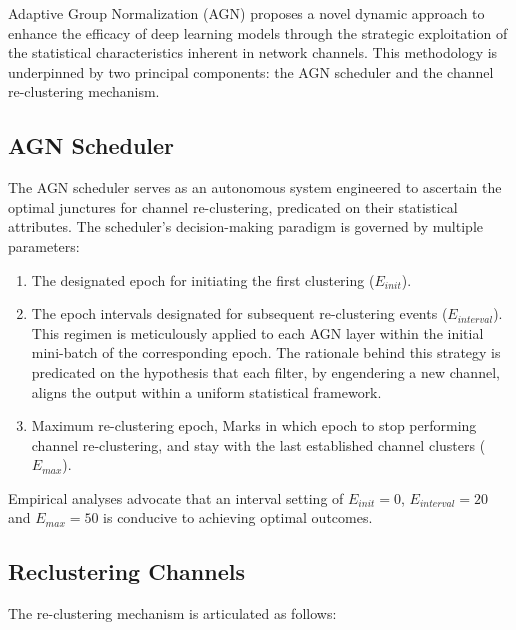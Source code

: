 Adaptive Group Normalization (AGN) proposes a novel dynamic approach to enhance the efficacy of deep learning models through the strategic exploitation of the statistical characteristics inherent in network channels. This methodology is underpinned by two principal components: the AGN scheduler and the channel re-clustering mechanism.

\subsection{AGN Scheduler}
The AGN scheduler serves as an autonomous system engineered to ascertain the optimal junctures for channel re-clustering, predicated on their statistical attributes. The scheduler's decision-making paradigm is governed by multiple parameters:

\begin{enumerate}
    \item The designated epoch for initiating the first clustering (\(E_{init}\)).
    \item The epoch intervals designated for subsequent re-clustering events (\(E_{interval}\)). This regimen is meticulously applied to each AGN layer within the initial mini-batch of the corresponding epoch. The rationale behind this strategy is predicated on the hypothesis that each filter, by engendering a new channel, aligns the output within a uniform statistical framework.
    \item Maximum re-clustering epoch, Marks in which epoch to stop performing channel re-clustering, and stay with the last established channel clusters (\(E_{max}\)).
\end{enumerate}

Empirical analyses advocate that an interval setting of \(E_{init} = 0\), \(E_{interval} = 20\) and \(E_{max} = 50\) is conducive to achieving optimal outcomes.

\subsection{Reclustering Channels}
The re-clustering mechanism is articulated as follows:

